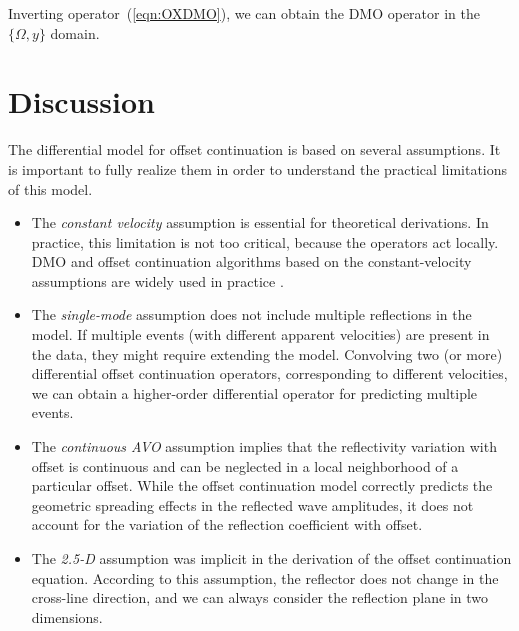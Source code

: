 
Inverting operator~(\ref{eqn:OXDMO}), we can obtain the DMO operator in the
$\{\Omega,y\}$ domain.

\section{Discussion}

The differential model for offset continuation is based on several
assumptions. It is important to fully realize them in order to
understand the practical limitations of this model.
\begin{itemize}
\item The \emph{constant velocity} assumption is essential for
  theoretical derivations. In practice, this limitation is not too
  critical, because the operators act locally. DMO and
  offset continuation algorithms based on the constant-velocity
  assumptions are widely used in practice \cite[]{DMO00-00-04960496}.
\item The \emph{single-mode} assumption does not include multiple
  reflections in the model. If multiple events (with different
  apparent velocities) are present in the data, they might require
  extending the model. Convolving two (or more) differential offset
  continuation operators, corresponding to different velocities, we
  can obtain a higher-order differential operator for predicting
  multiple events.
\item The \emph{continuous AVO} assumption implies that the
  reflectivity variation with offset is continuous and can be
  neglected in a local neighborhood of a particular offset. While the
  offset continuation model correctly predicts the geometric spreading
  effects in the reflected wave amplitudes, it does not account for
  the variation of the reflection coefficient with offset.
\item The \emph{2.5-D} assumption was implicit in the derivation of
  the offset continuation equation. According to this assumption, the
  reflector does not change in the cross-line direction, and we can
  always consider the reflection plane in two dimensions. 
\end{itemize}

